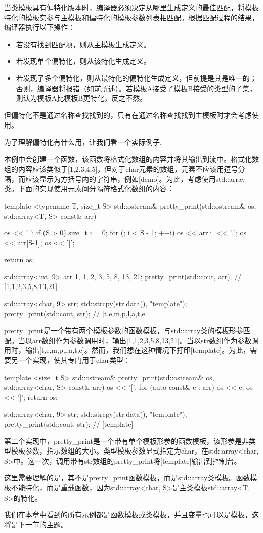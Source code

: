当类模板具有偏特化版本时，编译器必须决定从哪里生成定义的最佳匹配，将模板特化的模板实参与主模板和偏特化的模板参数列表相匹配。根据匹配过程的结果，编译器执行以下操作：

\begin{itemize}
  \item 若没有找到匹配项，则从主模板生成定义。
  \item 若发现单个偏特化，则从该特化生成定义。
  \item 若发现了多个偏特化，则从最特化的偏特化生成定义，但前提是其是唯一的；否则，编译器将报错（如前所述）。若模板A接受了模板B接受的类型的子集，则认为模板A比模板B更特化，反之不然。
\end{itemize}

但偏特化不是通过名称查找找到的，只有在通过名称查找找到主模板时才会考虑使用。

为了理解偏特化有什么用，让我们看一个实际例子.

本例中会创建一个函数，该函数将格式化数组的内容并将其输出到流中。格式化数组的内容应该类似于[1,2,3,4,5]，但对于char元素的数组，元素不应该用逗号分隔，而应该显示为方括号内的字符串，例如[demo]。为此，考虑使用std::array类。下面的实现使用元素间分隔符格式化数组的内容：

\begin{cppcode}
template <typename T, size_t S>
std::ostream& pretty_print(std::ostream& os,
                           std::array<T, S> const& arr)
{
	os << '[';
	if (S > 0)
	{
		size_t i = 0;
		for (; i < S - 1; ++i)
		os << arr[i] << ',';
		os << arr[S-1];
	}
	os << ']';
	
	return os;
}

std::array<int, 9> arr {1, 1, 2, 3, 5, 8, 13, 21};
pretty_print(std::cout, arr); // [1,1,2,3,5,8,13,21]

std::array<char, 9> str;
std::strcpy(str.data(), "template");
pretty_print(std::cout, str); // [t,e,m,p,l,a,t,e]
\end{cppcode}

pretty_print是一个带有两个模板参数的函数模板，与std::array类的模板形参匹配。当以arr数组作为参数调用时，输出[1,1,2,3,5,8,13,21]。当以str数组作为参数调用时，输出[t,e,m,p,l,a,t,e]。然而，我们想在这种情况下打印[template]。为此，需要另一个实现，使其专门用于char类型：

\begin{cppcode}
template <size_t S>
std::ostream& pretty_print(std::ostream& os,
						   std::array<char, S> const& arr)
{
	os << '[';
	for (auto const& e : arr)
		os << e;
	os << ']';
	return os;
}

std::array<char, 9> str;
std::strcpy(str.data(), "template");
pretty_print(std::cout, str); // [template]
\end{cppcode}

第二个实现中，pretty_print是一个带有单个模板形参的函数模板，该形参是非类型模板参数，指示数组的大小。类型模板参数显式指定为char，在std::array<char, S>中。这一次，调用带有str数组的pretty_print将[template]输出到控制台。

这里需要理解的是，其不是pretty_print函数模板，而是std::array类模板。函数模板不能特化，而是重载函数，因为std::array<char, S>是主类模板std::array<T, S>的特化。

我们在本章中看到的所有示例都是函数模板或类模板，并且变量也可以是模板，这将是下一节的主题。


